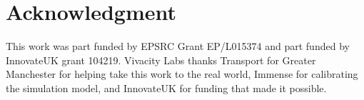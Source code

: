 \documentclass[a4paper, conference]{IEEEtran}
\begin{document}
%




\section*{Acknowledgment}
This work was part funded by EPSRC Grant EP/L015374 and part funded by InnovateUK grant 104219. 
Vivacity Labs thanks Transport for Greater Manchester for helping take this work to the real world, Immense for calibrating the simulation model, and InnovateUK for funding that made it possible.



%
%
%
  
\end{document}

